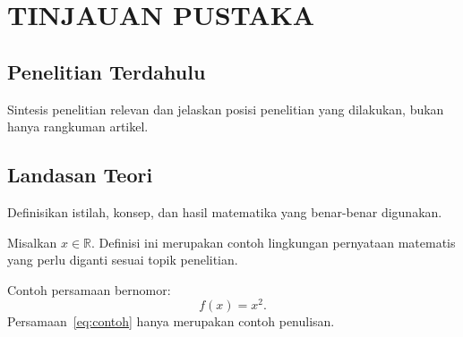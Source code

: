 \chapter{TINJAUAN PUSTAKA}
\section{Penelitian Terdahulu}
Sintesis penelitian relevan dan jelaskan posisi penelitian yang dilakukan, bukan hanya rangkuman artikel.
\section{Landasan Teori}
Definisikan istilah, konsep, dan hasil matematika yang benar-benar digunakan.
\begin{definition}
Misalkan $x\in\mathbb{R}$. Definisi ini merupakan contoh lingkungan pernyataan matematis yang perlu diganti sesuai topik penelitian.
\end{definition}
Contoh persamaan bernomor:
\begin{equation}\label{eq:contoh}
 f(x)=x^2.
\end{equation}
Persamaan~\eqref{eq:contoh} hanya merupakan contoh penulisan.
